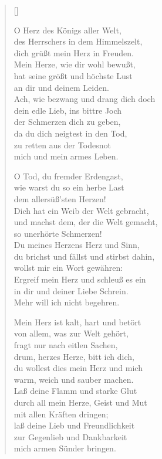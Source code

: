 \begin{multicols}{2}
\settowidth{\versewidth}{Ach, wie bezwang und drang dich doch}
\begin{verse}[\versewidth]


 O Herz des Königs aller Welt,\\
des Herrschers in dem Himmelszelt,\\
dich grüßt mein Herz in Freuden.\\
Mein Herze, wie dir wohl bewußt,\\
hat seine größt und höchste Lust\\
an dir und deinem Leiden.\\
Ach, wie bezwang und drang dich doch\\
dein edle Lieb, ins bittre Joch\\
der Schmerzen dich zu geben,\\
da du dich neigtest in den Tod,\\
zu retten aus der Todesnot\\
mich und mein armes Leben.

 O Tod, du fremder Erdengast,\\
wie warst du so ein herbe Last\\
dem allersüß'sten Herzen!\\
Dich hat ein Weib der Welt gebracht,\\
und machst dem, der die Welt gemacht,\\
so unerhörte Schmerzen!\\
Du meines Herzens Herz und Sinn,\\
du brichst und fällst und stirbst dahin,\\
wollst mir ein Wort gewähren:\\
Ergreif mein Herz und schleuß es ein\\
in dir und deiner Liebe Schrein.\\
Mehr will ich nicht begehren.

 Mein Herz ist kalt, hart und betört\\
von allem, was zur Welt gehört,\\
fragt nur nach eitlen Sachen,\\
drum, herzes Herze, bitt ich dich,\\
du wollest dies mein Herz und mich\\
warm, weich und sauber machen.\\
Laß deine Flamm und starke Glut\\
durch all mein Herze, Geist und Mut\\
mit allen Kräften dringen;\\
laß deine Lieb und Freundlichkeit\\
zur Gegenlieb und Dankbarkeit\\
mich armen Sünder bringen.


\end{verse}
\end{multicols}
